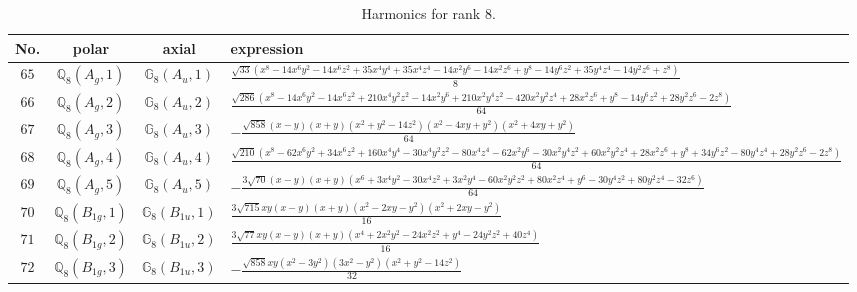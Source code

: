 \documentclass[fleqn,8pt,landscape]{jsarticle}
\begin{document}
\begin{table}[ht!]
\begin{center}
\caption{Harmonics for rank 8.}
\renewcommand{\arraystretch}{1.3}
\begin{tabular}{cccl} \hline \hline
No. & polar & axial & expression \\ \hline
$ 65 $ & $ \mathbb{Q}_{8}(A_{g},1) $ & $ \mathbb{G}_{8}(A_{u},1) $ & $ \frac{\sqrt{33} \left(x^{8} - 14 x^{6} y^{2} - 14 x^{6} z^{2} + 35 x^{4} y^{4} + 35 x^{4} z^{4} - 14 x^{2} y^{6} - 14 x^{2} z^{6} + y^{8} - 14 y^{6} z^{2} + 35 y^{4} z^{4} - 14 y^{2} z^{6} + z^{8}\right)}{8} $ \\
$ 66 $ & $ \mathbb{Q}_{8}(A_{g},2) $ & $ \mathbb{G}_{8}(A_{u},2) $ & $ \frac{\sqrt{286} \left(x^{8} - 14 x^{6} y^{2} - 14 x^{6} z^{2} + 210 x^{4} y^{2} z^{2} - 14 x^{2} y^{6} + 210 x^{2} y^{4} z^{2} - 420 x^{2} y^{2} z^{4} + 28 x^{2} z^{6} + y^{8} - 14 y^{6} z^{2} + 28 y^{2} z^{6} - 2 z^{8}\right)}{64} $ \\
$ 67 $ & $ \mathbb{Q}_{8}(A_{g},3) $ & $ \mathbb{G}_{8}(A_{u},3) $ & $ - \frac{\sqrt{858} \left(x - y\right) \left(x + y\right) \left(x^{2} + y^{2} - 14 z^{2}\right) \left(x^{2} - 4 x y + y^{2}\right) \left(x^{2} + 4 x y + y^{2}\right)}{64} $ \\
$ 68 $ & $ \mathbb{Q}_{8}(A_{g},4) $ & $ \mathbb{G}_{8}(A_{u},4) $ & $ \frac{\sqrt{210} \left(x^{8} - 62 x^{6} y^{2} + 34 x^{6} z^{2} + 160 x^{4} y^{4} - 30 x^{4} y^{2} z^{2} - 80 x^{4} z^{4} - 62 x^{2} y^{6} - 30 x^{2} y^{4} z^{2} + 60 x^{2} y^{2} z^{4} + 28 x^{2} z^{6} + y^{8} + 34 y^{6} z^{2} - 80 y^{4} z^{4} + 28 y^{2} z^{6} - 2 z^{8}\right)}{64} $ \\
$ 69 $ & $ \mathbb{Q}_{8}(A_{g},5) $ & $ \mathbb{G}_{8}(A_{u},5) $ & $ - \frac{3 \sqrt{70} \left(x - y\right) \left(x + y\right) \left(x^{6} + 3 x^{4} y^{2} - 30 x^{4} z^{2} + 3 x^{2} y^{4} - 60 x^{2} y^{2} z^{2} + 80 x^{2} z^{4} + y^{6} - 30 y^{4} z^{2} + 80 y^{2} z^{4} - 32 z^{6}\right)}{64} $ \\
$ 70 $ & $ \mathbb{Q}_{8}(B_{1g},1) $ & $ \mathbb{G}_{8}(B_{1u},1) $ & $ \frac{3 \sqrt{715} x y \left(x - y\right) \left(x + y\right) \left(x^{2} - 2 x y - y^{2}\right) \left(x^{2} + 2 x y - y^{2}\right)}{16} $ \\
$ 71 $ & $ \mathbb{Q}_{8}(B_{1g},2) $ & $ \mathbb{G}_{8}(B_{1u},2) $ & $ \frac{3 \sqrt{77} x y \left(x - y\right) \left(x + y\right) \left(x^{4} + 2 x^{2} y^{2} - 24 x^{2} z^{2} + y^{4} - 24 y^{2} z^{2} + 40 z^{4}\right)}{16} $ \\
$ 72 $ & $ \mathbb{Q}_{8}(B_{1g},3) $ & $ \mathbb{G}_{8}(B_{1u},3) $ & $ - \frac{\sqrt{858} x y \left(x^{2} - 3 y^{2}\right) \left(3 x^{2} - y^{2}\right) \left(x^{2} + y^{2} - 14 z^{2}\right)}{32} $ \\

\end{tabular}
\end{center}
\end{table}
\end{document}

